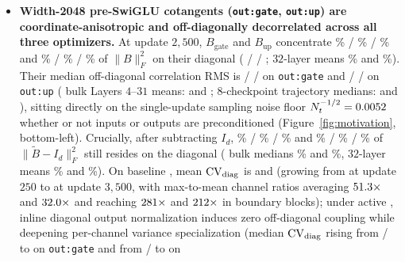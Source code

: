 \begin{itemize}
\item \textbf{Width-2048 pre-SwiGLU cotangents (\texttt{out:gate},
  \texttt{out:up}) are coordinate-anisotropic and off-diagonally decorrelated
  across all three optimizers.}
  At update $2{,}500$, $B_{\text{gate}}$ and $B_{\text{up}}$ concentrate
  \motMuonOutGateDiagEMedPct\% / \motOutGateDiagEMedPct\% /
  \motWtOutGateDiagEMedPct\% and \motMuonOutUpDiagEMedPct\% /
  \motOutUpDiagEMedPct\% / \motWtOutUpDiagEMedPct\% of $\|B\|_F^2$ on their
  diagonal ( /  / ;  $32$-layer
  means \motOutGateDiagEMeanPct\% and \motOutUpDiagEMeanPct\%). Their median
  off-diagonal correlation RMS is \motMuonOutGateCorrRmsMed{} /
  \motOutGateCorrRmsMed{} / \motWtOutGateCorrRmsMed{} on \texttt{out:gate} and
  \motMuonOutUpCorrRmsMed{} / \motOutUpCorrRmsMed{} / \motWtOutUpCorrRmsMed{} on
  \texttt{out:up} ( bulk Layers $4$--$31$ means:
  \motOutGateBulkCorrRmsMean{} and \motOutUpBulkCorrRmsMean{}; $8$-checkpoint
  trajectory medians: \motOutGateTrajCorrRmsMed{} and
  \motOutUpTrajCorrRmsMed{}), sitting directly on the single-update sampling
  noise floor $N_t^{-1/2} = 0.0052{}$ whether or not inputs or
  outputs are preconditioned (Figure~\ref{fig:motivation}, bottom-left).
  Crucially, after subtracting $I_d$, \motMuonOutGateDiagAnisoMedPct\% /
  \motOutGateDiagAnisoMedPct\% / \motWtOutGateDiagAnisoMedPct\% and
  \motMuonOutUpDiagAnisoMedPct\% / \motOutUpDiagAnisoMedPct\% /
  \motWtOutUpDiagAnisoMedPct\% of $\|\tilde B - I_d\|_F^2$ still resides on the
  diagonal ( bulk medians \motOutGateBulkDiagAnisoMedPct\% and
  \motOutUpBulkDiagAnisoMedPct\%, $32$-layer means \motOutGateDiagAnisoMeanPct\%
  and \motOutUpDiagAnisoMeanPct\%). On baseline , mean
  $\mathrm{CV}_{\operatorname{diag}}$ is \motOutGateDiagCvMean{} and \motOutUpDiagCvMean{}
  (growing from \motOutGateEarlyCvMean{} at update $250$ to
  \motOutGatePeakCvMean{} at update $3{,}500$, with max-to-mean channel ratios
  averaging $51.3\times$ and $32.0\times$ and
  reaching $281\times$ and $212\times$ in
  boundary blocks); under active , inline diagonal output
  normalization induces zero off-diagonal coupling while deepening per-channel
  variance specialization (median $\mathrm{CV}_{\operatorname{diag}}$ rising from
  \motMuonOutGateDiagCvMed{} / \motOutGateDiagCvMed{} to
  \motWtOutGateDiagCvMed{} on \texttt{out:gate} and from
  \motMuonOutUpDiagCvMed{} / \motOutUpDiagCvMed{} to \motWtOutUpDiagCvMed{} on

\end{itemize}
